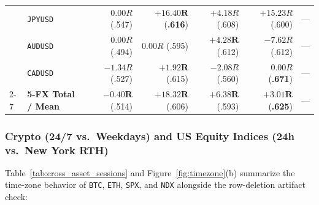 \documentclass{article}
\begin{document}
\begin{table}[t]
\begin{tabular}{@{}llrrrrr@{}}
    & \texttt{JPYUSD} & $0.00R$ (.547) & $\mathbf{+16.40R}$ (\textbf{.616}) & $+4.18R$ (.608) & $+15.23R$ (.600) & --- \\
    & \texttt{AUDUSD} & $0.00R$ (.494) & $0.00R$ (.595) & $\mathbf{+4.28R}$ (.612) & $-7.62R$ (.612) & --- \\
    & \texttt{CADUSD} & $-1.34R$ (.527) & $\mathbf{+1.92R}$ (.615) & $-2.08R$ (.560) & $0.00R$ (\textbf{.671}) & --- \\
    \cmidrule(lr){2-7}
    & \textbf{5-FX Total / Mean} & $\mathbf{-0.40R}$ (.514) & $\mathbf{+18.32R}$ (.606) & $\mathbf{+6.38R}$ (.593) & $\mathbf{+3.01R}$ (\textbf{.625}) & --- \\
    \bottomrule
  \end{tabular}
\end{table}

\subsubsection{Crypto (24/7 vs.\ Weekdays) and US Equity Indices (24h vs.\ New York RTH)}

Table~\ref{tab:cross_asset_sessions} and Figure~\ref{fig:timezone}(b) summarize the time-zone behavior of \texttt{BTC}, \texttt{ETH}, \texttt{SPX}, and \texttt{NDX} alongside the row-deletion artifact check:
\end{document}
